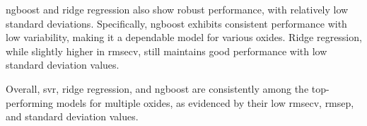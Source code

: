 \gls{ngboost} and ridge regression also show robust performance, with relatively low standard deviations.
Specifically, \gls{ngboost} exhibits consistent performance with low variability, making it a dependable model for various oxides.
Ridge regression, while slightly higher in \gls{rmsecv}, still maintains good performance with low standard deviation values.

Overall, \gls{svr}, ridge regression, and \gls{ngboost} are consistently among the top-performing models for multiple oxides, as evidenced by their low \gls{rmsecv}, \gls{rmsep}, and standard deviation values.

